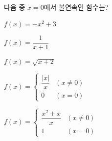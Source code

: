 다음 중 $x=0$에서 불연속인 함수는?
\begin{choicesii}{\rule[-3ex]{0pt}{8ex}$f(x)=-x^2+3$}{\rule[-3ex]{0pt}{8ex}$f(x)=\dfrac{1}{x+1}$}{\rule[-3ex]{0pt}{8ex}$f(x)=\sqrt{x+2}$}{\rule[-3ex]{0pt}{8ex}$f(x)=\begin{cases} \dfrac{|x|}{x} & (x\ne 0) \\ 0 & (x=0) \end{cases}$}{\rule[-3ex]{0pt}{8ex}$f(x)=\begin{cases} \dfrac{x^2+x}{x} & (x\ne 0) \\ 1 & (x=0) \end{cases}$}\end{choicesii}
